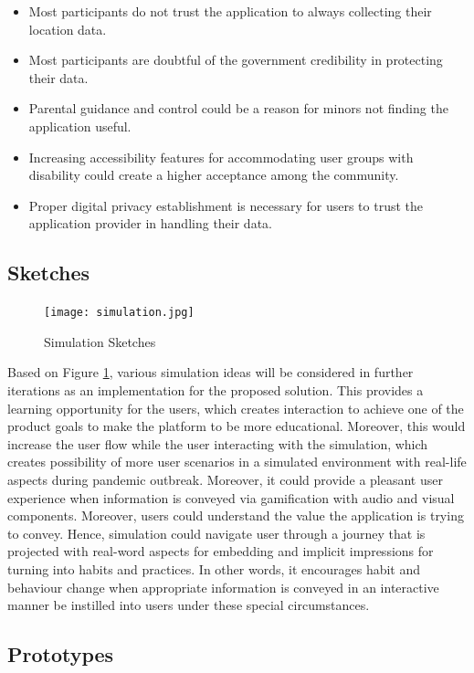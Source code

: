 \begin{enumerate}[1.]
\begin{itemize}
            \item Most participants do not trust the application to always collecting their location data.
            \item Most participants are doubtful of the government credibility in protecting their data. 
            \item Parental guidance and control could be a reason for minors not finding the application useful.
            \item Increasing accessibility features for accommodating user groups with disability could create a higher acceptance among the community.
            \item Proper digital privacy establishment is necessary for users to trust the application provider in handling their data.
          \end{itemize}
      \end{enumerate}

  \subsection{Sketches}
  \begin{figure}[H]
    \centering
    \texttt{[image: simulation.jpg]}
    \caption{Simulation Sketches}
    \label{fig:simulation}
  \end{figure}
  \par Based on Figure \ref{fig:simulation}, various simulation ideas will be considered in further iterations as an implementation for the proposed solution. This provides a learning opportunity for the users, which creates interaction to achieve one of the product goals to make the platform to be more educational. Moreover, this would increase the user flow while the user interacting with the simulation, which creates possibility of more user scenarios in a simulated environment with real-life aspects during pandemic outbreak. Moreover, it could provide a pleasant user experience when information is conveyed via gamification with audio and visual components. Moreover, users could understand the value the application is trying to convey. Hence, simulation could navigate user through a journey that is projected with real-word aspects for embedding and implicit impressions for turning into habits and practices. In other words, it encourages habit and behaviour change when appropriate information is conveyed in an interactive manner be instilled into users under these special circumstances.

  \subsection{Prototypes}
